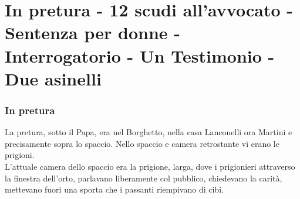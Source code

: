 \documentclass[10pt]{memoir} %
\begin{document}

\chapter{In pretura - 12 scudi all'avvocato - Sentenza per donne - Interrogatorio - Un Testimonio - Due asinelli}
\subsection{In pretura}
La pretura, sotto il Papa, era nel Borghetto, nella casa Lanconelli ora Martini e precisamente sopra lo spaccio. Nello spaccio e camera retrostante vi erano le prigioni.\\
L'attuale camera dello spaccio era la prigione, larga, dove i prigionieri attraverso la finestra dell'orto, parlavano liberamente col pubblico, chiedevano la carità, mettevano fuori una sporta che i passanti riempivano di cibi.\\
\end{document}

